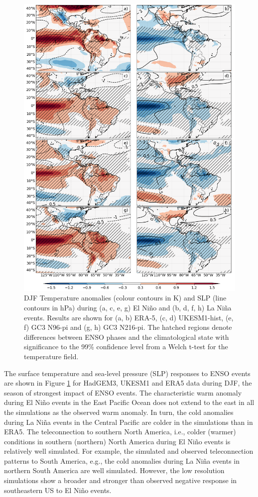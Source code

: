 \begin{figure}[t!]
\centering
 \includegraphics[width=0.87\linewidth]{figures/ensotemp_3}
\caption[ENSO teleconnections of temperature and SLP to the region of the AMS]{ DJF Temperature anomalies (colour contours in K) and SLP (line contours in hPa) during (a, c, e, g) El Ni\~no and (b, d, f, h) La Ni\~na events. Results are shown for (a, b) ERA-5, (c, d) UKESM1-hist, (e, f) GC3 N96-pi and (g, h) GC3 N216-pi. The hatched regions denote differences between ENSO phases and the climatological state with significance to the 99\% confidence level from a Welch t-test for the temperature field. }
\label{fig:10}
\end{figure}

The surface temperature and sea-level pressure (SLP) responses to ENSO events are shown in Figure \ref{fig:10} for HadGEM3, UKESM1 and ERA5 data during DJF, the season of strongest impact of ENSO events.
The characteristic warm anomaly during El Ni\~no events in the East Pacific Ocean does not extend to the east in all the simulations as the observed warm anomaly. In turn, the cold anomalies during La Ni\~na events in the Central Pacific are colder in the simulations than in ERA5. 
The teleconnection to southern North America, i.e., colder (warmer) conditions in southern (northern) North America during El Ni\~no events is relatively well simulated. For example, the simulated and observed teleconnection patterns to South America, e.g., the cold anomalies during La Ni\~na events in northern South America are well simulated. However, the low resolution simulations show a broader and stronger than observed negative response in southeastern US to El Ni\~no events. 

